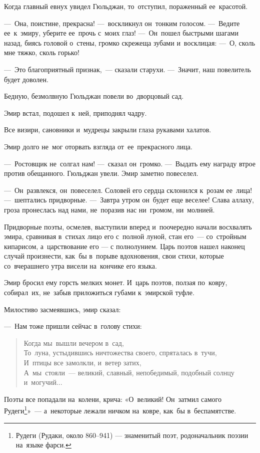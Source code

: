 \documentclass[12pt,a4paper]{book}
\begin{document}
Когда главный евнух увидел Гюльджан, то~отступил, пораженный ее~красотой.

—~Она, поистине, прекрасна! —~воскликнул он~тонким голосом. —~Ведите ее~к~эмиру, уберите ее~прочь с~моих глаз! —~Он~пошел быстрыми шагами назад, биясь головой о~стены, громко скрежеща зубами и~восклицая: —~О, сколь мне тяжко, сколь горько!

—~Это благоприятный признак,~— сказали старухи. —~Значит, наш повелитель будет доволен.

Бедную, безмолвную Гюльджан повели во~дворцовый сад.

Эмир встал, подошел к~ней, приподнял чадру.

Все визири, сановники и~мудрецы закрыли глаза рукавами халатов.

Эмир долго не~мог оторвать взгляда от~ее~прекрасного лица.

—~Ростовщик не~солгал нам! —~сказал он~громко. —~Выдать ему награду втрое против обещанного. Гюльджан увели. Эмир заметно повеселел.

—~Он~развлекся, он~повеселел. Соловей его сердца склонился к~розам ее~лица! —~шептались придворные. —~Завтра утром он~будет еще веселее! Слава аллаху, гроза пронеслась над нами, не~поразив нас ни~громом, ни~молнией.

Придворные поэты, осмелев, выступили вперед и~поочередно начали восхвалять эмира, сравнивая в~стихах лицо его с~полной луной, стан его~— со~стройным кипарисом, а~царствование его --- с полнолунием. Царь поэтов нашел наконец случай произнести, как~бы в~порыве вдохновения, свои стихи, которые со~вчерашнего утра висели на~кончике его языка.

Эмир бросил ему горсть мелких монет. И~царь поэтов, ползая по~ковру, собирал~их, не~забыв приложиться губами к~эмирской туфле.

Милостиво засмеявшись, эмир сказал:

—~Нам тоже пришли сейчас в~голову стихи:

\begin{verse}
Когда мы~вышли вечером в~сад, \\
То~луна, устыдившись ничтожества своего, спряталась в~тучи, \\
И~птицы все замолкли, и~ветер затих, \\
А~мы~стояли~— великий, славный, непобедимый, подобный солнцу и~могучий...	
\end{verse}

Поэты все попадали на~колени, крича: «О~великий! Он~затмил самого Рудеги\footnote{Рудеги (Рудаки, около 860--941) — знаменитый поэт, родоначальник поэзии на~языке фарси.}»~— а~некоторые лежали ничком на~ковре, как~бы в~беспамятстве.
\end{document}
